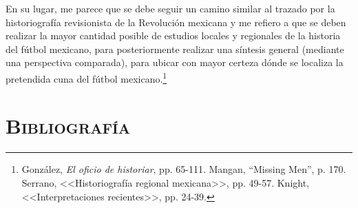\documentclass[11pt,a5paper,twoside]{book} %
\begin{document}
En su lugar, me parece que se debe seguir un camino similar al trazado por la historiografía revisionista de la Revolución mexicana y me refiero a que se deben realizar la mayor cantidad posible de estudios locales y regionales de la historia del fútbol mexicano, para posteriormente realizar una síntesis general (mediante una perspectiva comparada), para ubicar con mayor certeza dónde se localiza la pretendida cuna del fútbol mexicano.\footnote{González, \emph{El oficio de historiar}, pp. 65-111. Mangan, ``Missing Men'', p. 170. Serrano, <<Historiografía regional mexicana>>, pp. 49-57. Knight, <<Interpretaciones recientes>>, pp. 24-39.}


\chapter*{\centering\mdseries\Large\textsc{Bibliografía}}
\end{document}
